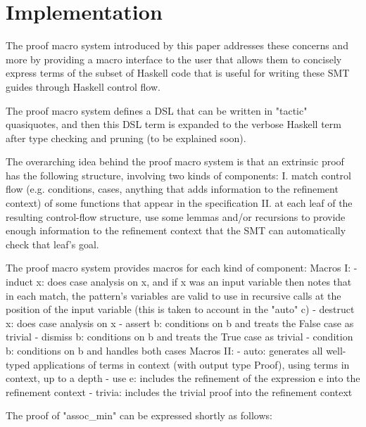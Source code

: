 \section{Implementation}


The proof macro system introduced by this paper addresses these concerns and more by providing a macro interface to the user that allows them to concisely express terms of the subset of Haskell code that is useful for writing these SMT guides through Haskell control flow.

The proof macro system defines a DSL that can be written in "tactic" quasiquotes, and then this DSL term is expanded to the verbose Haskell term after type checking and pruning (to be explained soon).



The overarching idea behind the proof macro system is that an extrinsic proof has the following structure, involving two kinds of components:
I. match control flow (e.g. conditions, cases, anything that adds information to the refinement context) of some functions that appear in the specification
II. at each leaf of the resulting control-flow structure, use some lemmas and/or recursions to provide enough information to the refinement context that the SMT can automatically check that leaf's goal.


The proof macro system provides macros for each kind of component:
Macros I:
- induct x: does case analysis on x, and if x was an input variable then notes that in each match, the pattern's variables are valid to use in recursive calls at the position of the input variable (this is taken to account in the "auto" c)
- destruct x: does case analysis on x
- assert b: conditions on b and treats the False case as trivial 
- dismiss b: conditions on b and treats the True case as trivial
- condition b: conditions on b and handles both cases
Macros II:
- auto: generates all well-typed applications of terms in context (with output type Proof), using terms in context, up to a depth
- use e: includes the refinement of the expression e into the refinement context
- trivia: includes the trivial proof into the refinement context

The proof of "assoc\_min" can be expressed shortly as follows:


